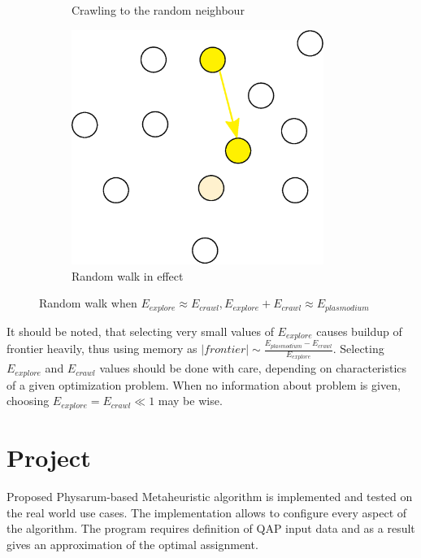 \documentclass[english,a4paper,twoside]{ppfcmthesis}
\begin{document}
\begin{figure}
\begin{subfigure}{0.3\textwidth}
    \caption{Crawling to the random neighbour}
  \end{subfigure}
  \begin{subfigure}{0.3\textwidth}
    \centering
    \includegraphics[width=0.9\textwidth]{algorithm/metaheuristic/random3.eps}
    \caption{Random walk in effect}
  \end{subfigure}

  \caption{Random walk when $E_{explore} \approx E_{crawl}, E_{explore} + E_{crawl} \approx E_{plasmodium}$}
  \label{figure:m_explore_special}
\end{figure}

It should be noted, that selecting very small values of $E_{explore}$ causes buildup of frontier heavily, thus using memory as $|frontier| \sim \frac{E_{plasmodium} - E_{crawl}}{E_{explore}}$. Selecting $E_{explore}$ and $E_{crawl}$ values should be done with care, depending on characteristics of a given optimization problem. When no information about problem is given, choosing $E_{explore} = E_{crawl} \ll 1$ may be wise. 


\chapter{Project}
\label{chapter:project}

Proposed Physarum-based Metaheuristic algorithm is implemented and tested on the real world use cases. The implementation allows to configure every aspect of the algorithm. The program requires definition of QAP input data and as a result gives an approximation of the optimal assignment.
\end{document}
